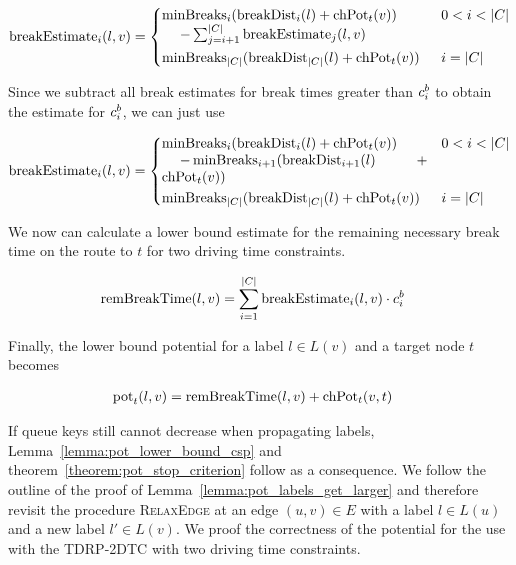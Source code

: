 \begin{align}\label{eq:number_breaks_sum}
	\breakEstimate_i(l,v)  =\begin{dcases}
		\parbox[t]{.55\textwidth}{$\minBreaks_i(\breakDist_i(l) + \chpotential_t(v))$ \\\phantom{{}=1}$- \sum_{j=i+1}^{|C|}{\breakEstimate_j(l,v)}$} & 0 < i < |C| \\
		\minBreaks_{|C|}(\breakDist_{|C|}(l) + \chpotential_t(v)) & i=|C|
	\end{dcases}
\end{align}

Since we subtract all break estimates for break times greater than $c_i^b$ to obtain the estimate for $c_i^b$, we can just use

\begin{align}\label{eq:break_estimate_n}
	\breakEstimate_i(l,v) = \begin{dcases}
		\parbox[t]{.55\textwidth}{$\minBreaks_i(\breakDist_i(l) + \chpotential_t(v))$ \\\phantom{{}=1}$- \minBreaks_{i+1}(\breakDist_{i+1}(l) + \chpotential_t(v))$} & 0 < i < |C| \\
		\minBreaks_{|C|}(\breakDist_{|C|}(l) + \chpotential_t(v)) & i=|C|
	\end{dcases}
\end{align}

We now can calculate a lower bound estimate for the remaining necessary break time on the route to $t$ for two driving time constraints.

\begin{align}\label{eq:rem_break_time_n}
	\begin{split}
		\operatorname{remBreakTime}(l,v) & = \sum_{i=1}^{|C|}{\operatorname{breakEstimate}_i(l,v)} \cdot c_i^b
	\end{split}
\end{align}

Finally, the lower bound potential for a label $l \in L(v)$ and a target node $t$ becomes

\begin{align}\label{eq:multiple_breaks_pot}
	\begin{split}
		\operatorname{pot}_t(l,v) & =\operatorname{remBreakTime}(l,v) + \operatorname{chPot}_t(v,t)
	\end{split}
\end{align}

If queue keys still cannot decrease when propagating labels, Lemma~\ref{lemma:pot_lower_bound_csp} and theorem~\ref{theorem:pot_stop_criterion} follow as a consequence. We follow the outline of the proof of Lemma~\ref{lemma:pot_labels_get_larger} and therefore revisit the procedure \textsc{RelaxEdge} at an edge $(u,v) \in E$ with a label $l \in L(u)$ and a new label $l' \in L(v)$. We proof the correctness of the potential for the use with the TDRP-2DTC with two driving time constraints.


